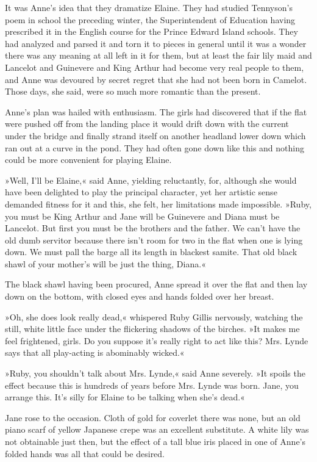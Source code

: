 It was Anne’s idea that they dramatize Elaine. They had studied Tennyson’s poem in school the preceding winter, the Superintendent of Education having prescribed it in the English course for the Prince Edward Island schools. They had analyzed and parsed it and torn it to pieces in general until it was a wonder there was any meaning at all left in it for them, but at least the fair lily maid and Lancelot and Guinevere and King Arthur had become very real people to them, and Anne was devoured by secret regret that she had not been born in Camelot. Those days, she said, were so much more romantic than the present.

Anne’s plan was hailed with enthusiasm. The girls had discovered that if the flat were pushed off from the landing place it would drift down with the current under the bridge and finally strand itself on another headland lower down which ran out at a curve in the pond. They had often gone down like this and nothing could be more convenient for playing Elaine.

»Well, I’ll be Elaine,« said Anne, yielding reluctantly, for, although she would have been delighted to play the principal character, yet her artistic sense demanded fitness for it and this, she felt, her limitations made impossible. »Ruby, you must be King Arthur and Jane will be Guinevere and Diana must be Lancelot. But first you must be the brothers and the father. We can’t have the old dumb servitor because there isn’t room for two in the flat when one is lying down. We must pall the barge all its length in blackest samite. That old black shawl of your mother’s will be just the thing, Diana.«

The black shawl having been procured, Anne spread it over the flat and then lay down on the bottom, with closed eyes and hands folded over her breast.

»Oh, she does look really dead,« whispered Ruby Gillis nervously, watching the still, white little face under the flickering shadows of the birches. »It makes me feel frightened, girls. Do you suppose it’s really right to act like this? Mrs. Lynde says that all play-acting is abominably wicked.«

»Ruby, you shouldn’t talk about Mrs. Lynde,« said Anne severely. »It spoils the effect because this is hundreds of years before Mrs. Lynde was born. Jane, you arrange this. It’s silly for Elaine to be talking when she’s dead.«

Jane rose to the occasion. Cloth of gold for coverlet there was none, but an old piano scarf of yellow Japanese crepe was an excellent substitute. A white lily was not obtainable just then, but the effect of a tall blue iris placed in one of Anne’s folded hands was all that could be desired.

